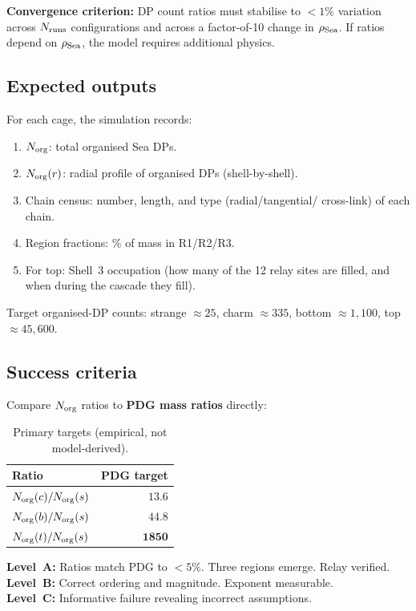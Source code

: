 \documentclass[11pt,letterpaper]{article}
\newcommand{\Norg}{N_{\rm org}}
\begin{document}
\textbf{Convergence criterion:} DP count ratios must stabilise to
$< 1\%$ variation across $N_{\rm runs}$ configurations and across
a factor-of-10 change in $\rho_{\rm Sea}$.  If ratios depend on
$\rho_{\rm Sea}$, the model requires additional physics.

\subsection{Expected outputs}

For each cage, the simulation records:
\begin{enumerate}
\item $\Norg$: total organised Sea DPs.
\item $\Norg(r)$: radial profile of organised DPs (shell-by-shell).
\item Chain census: number, length, and type (radial/tangential/
  cross-link) of each chain.
\item Region fractions: \% of mass in R1/R2/R3.
\item For top: Shell~3 occupation (how many of the 12 relay sites
  are filled, and when during the cascade they fill).
\end{enumerate}

Target organised-DP counts: strange $\approx 25$,
charm $\approx 335$, bottom $\approx 1{,}100$,
top $\approx 45{,}600$.

\subsection{Success criteria}

Compare $\Norg$ ratios to \textbf{PDG mass ratios} directly:

\begin{table}[H]
\centering
\caption{Primary targets (empirical, not model-derived).}
\begin{tabular}{@{}lr@{}}
\toprule
Ratio & PDG target \\
\midrule
$\Norg(c) / \Norg(s)$ & $\mathbf{13.6}$ \\
$\Norg(b) / \Norg(s)$ & $\mathbf{44.8}$ \\
$\Norg(t) / \Norg(s)$ & $\mathbf{1850}$ \\
\bottomrule
\end{tabular}
\end{table}

\textbf{Level~A:} Ratios match PDG to $< 5\%$.  Three regions
emerge.  Relay verified.\\
\textbf{Level~B:} Correct ordering and magnitude.  Exponent
measurable.\\
\textbf{Level~C:} Informative failure revealing incorrect
assumptions.
\end{document}
